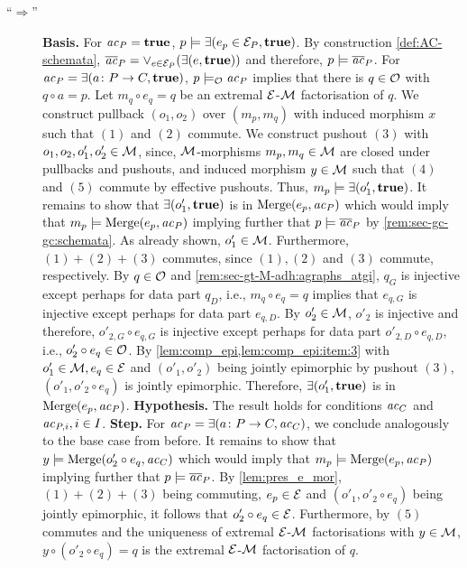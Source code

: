 \begin{description}
  \item [``$\Rightarrow$''] \textbf{Basis.}
  For $\mathit{ac}_P=\textbf{true}$, $p \models \exists(e_p \in \mathcal{E}_P,\textbf{true})$.
  By construction \cref{def:AC-schemata}, $\overline{\mathit{ac}}_P=\vee_{e \in \mathcal{E}_P}(\exists(e,\textbf{true}))$ and therefore, $p \models \overline{\mathit{ac}}_P$.
  For $\mathit{ac}_P=\exists(a\colon P \to C,\textbf{true})$, $p \models_{{\cal O}} \mathit{ac}_P$ implies that there is $q \in {\cal O}$ with $q \circ a=p$.
  Let $m_q \circ e_q=q$ be an extremal $\mathcal{E}$-${\cal M}$ factorisation of $q$.
  We construct pullback $(o_1,o_2)$ over $(m_p,m_q)$ with induced morphism $x$ such that $(1)$ and $(2)$ commute.
  We construct pushout $(3)$ with $o_1,o_2,o'_1,o'_2 \in {\cal M}$, since, ${\cal M}$-morphisms $m_p,m_q \in {\cal M}$ are closed under pullbacks and pushouts, and induced morphism $y \in {\cal M}$ such that $(4)$ and $(5)$ commute by effective pushouts.
  Thus, $m_p \models \exists(o'_1,\textbf{true})$.
  It remains to show that $\exists(o'_1,\textbf{true})$ is in $\mathrm{Merge}(e_p,\mathit{ac}_P)$ which would imply that $m_p \models \mathrm{Merge}(e_p,\mathit{ac}_P)$ implying further that $p \models \overline{\mathit{ac}}_P$ by \cref{rem:sec-gc-gc:schemata}.
  As already shown, $o'_1 \in {\cal M}$.
  Furthermore, $(1)+(2)+(3)$ commutes, since $(1),(2)$ and $(3)$ commute, respectively.
  By $q \in {\cal O}$ and \cref{rem:sec-gt-M-adh:agraphs_atgi}, $q_G$ is injective except perhaps for data part $q_D$, i.e., $m_q \circ e_q=q$ implies that $e_{q,G}$ is injective except perhaps for data part $e_{q,D}$.
  By $o'_2 \in {\cal M}$, $o'_2$ is injective and therefore, $o'_{2,G} \circ e_{q,G}$ is injective except perhaps for data part $o'_{2,D} \circ e_{q,D}$, i.e., $o'_2 \circ e_q \in {\cal O}$.
  By \cref{lem:comp_epi,lem:comp_epi:item:3} with $o'_1 \in {\cal M},e_q \in \mathcal{E}$ and $(o'_1,o'_2)$ being jointly epimorphic by pushout $(3)$, $(o'_1,o'_2 \circ e_q)$ is jointly epimorphic.
  Therefore, $\exists(o'_1,\textbf{true})$ is in $\mathrm{Merge}(e_p,\mathit{ac}_P)$.
  \textbf{Hypothesis.}
  The result holds for conditions $\mathit{ac}_C$ and $\mathit{ac}_{P,i},i \in I$.
  \textbf{Step.}
  For $\mathit{ac}_P=\exists(a\colon P \to C,\mathit{ac}_C)$, we conclude analogously to the base case from before.
  It remains to show that $y \models \mathrm{Merge}(o'_2 \circ e_q,\mathit{ac}_C)$ which would imply that $m_p \models \mathrm{Merge}(e_p,\mathit{ac}_P)$ implying further that $p \models \overline{\mathit{ac}}_P$.
  By \cref{lem:pres_e_mor}, $(1)+(2)+(3)$ being commuting, $e_p \in \mathcal{E}$ and $(o'_1,o'_2 \circ e_q)$ being jointly epimorphic, it follows that $o'_2 \circ e_q \in \mathcal{E}$.
  Furthermore, by $(5)$ commutes and the uniqueness of extremal $\mathcal{E}$-${\cal M}$ factorisations with $y \in {\cal M}$, $y \circ (o'_2 \circ e_q)=q$ is the extremal $\mathcal{E}$-${\cal M}$ factorisation of $q$.

\end{description}
